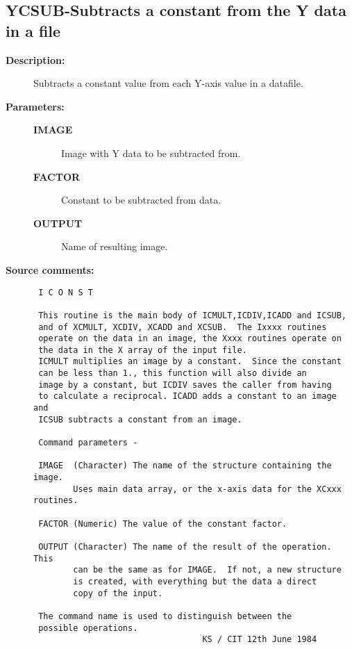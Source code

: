 \subsection{YCSUB-\label{YCSUB}Subtracts a constant from the Y data in a file}
\begin{description}

\item [{\bf Description:}]
 Subtracts a constant value from each Y-axis value in a datafile.

\item [{\bf Parameters:}]
\begin{description}
\item [{\bf IMAGE}]
 Image with Y data to be subtracted from.
\item [{\bf FACTOR}]
 Constant to be subtracted from data.
\item [{\bf OUTPUT}]
 Name of resulting image.
\end{description}

\item [{\bf Source comments:}]
\begin{verbatim}
 I C O N S T

 This routine is the main body of ICMULT,ICDIV,ICADD and ICSUB,
 and of XCMULT, XCDIV, XCADD and XCSUB.  The Ixxxx routines
 operate on the data in an image, the Xxxx routines operate on
 the data in the X array of the input file.
 ICMULT multiplies an image by a constant.  Since the constant
 can be less than 1., this function will also divide an
 image by a constant, but ICDIV saves the caller from having
 to calculate a reciprocal. ICADD adds a constant to an image and
 ICSUB subtracts a constant from an image.

 Command parameters -

 IMAGE  (Character) The name of the structure containing the image.
        Uses main data array, or the x-axis data for the XCxxx routines.

 FACTOR (Numeric) The value of the constant factor.

 OUTPUT (Character) The name of the result of the operation.  This
        can be the same as for IMAGE.  If not, a new structure
        is created, with everything but the data a direct
        copy of the input.

 The command name is used to distinguish between the
 possible operations.
                                  KS / CIT 12th June 1984
\end{verbatim}
\end{description}
